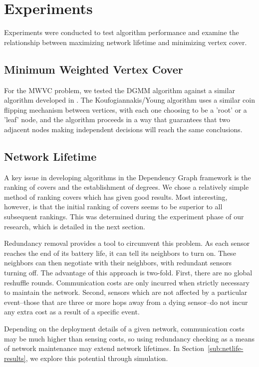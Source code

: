 \documentclass[conference, 10pt]{IEEEtran}
\begin{document}
\section{Experiments}
\label{sec:experiments}
Experiments were conducted to test algorithm performance and examine the relationship between maximizing network lifetime and minimizing vertex cover.
\subsection{Minimum Weighted Vertex Cover}
\label{sub:mwvc-exp}

For the MWVC problem, we tested the DGMM algorithm against a similar algorithm developed in \cite{1582746}. The Koufogiannakis/Young algorithm uses a similar coin flipping mechanism between vertices, with each one choosing to be a 'root' or a 'leaf' node, and the algorithm proceeds in a way that guarantees that two adjacent nodes making independent decisions will reach the same conclusions. 

\subsection{Network Lifetime}

A key issue in developing algorithms in the Dependency Graph framework is the ranking of covers and the establishment of degrees. We chose a relatively simple method of ranking covers which has given good results. Most interesting, however, is that the initial ranking of covers seems to be superior to all subsequent rankings. This was determined during the experiment phase of our research, which is detailed in the next section.

Redundancy removal provides a tool to circumvent this problem. As each sensor reaches the end of its battery life, it can tell its neighbors to turn on. These neighbors can then negotiate with their neighbors, with redundant sensors turning off. The advantage of this approach is two-fold. First, there are no global reshuffle rounds. Communication costs are only incurred when strictly necessary to maintain the network. Second, sensors which are not affected by a particular event--those that are three or more hops away from a dying sensor--do not incur any extra cost as a result of a specific event.

Depending on the deployment details of a given network, communication costs may be much higher than sensing costs, so using redundancy checking as a means of network maintenance may extend network lifetimes. In Section~\ref{sub:netlife-results}, we explore this potential through simulation.
\end{document}
